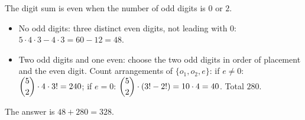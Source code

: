 The digit sum is even when the number of odd digits is $0$ or $2$.
\begin{itemize}
\item No odd digits: three distinct even digits, not leading with $0$: $5\cdot4\cdot3-4\cdot3=60-12=48$.
\item Two odd digits and one even: choose the two odd digits in order of placement and the even digit. Count arrangements of $\{o_1,o_2,e\}$: if $e\ne0$: $\dbinom52\cdot4\cdot3!=240$; if $e=0$: $\dbinom52\cdot(3!-2!)=10\cdot4=40$. Total $280$.
\end{itemize}
The answer is $48+280=\boxed{328}$.
